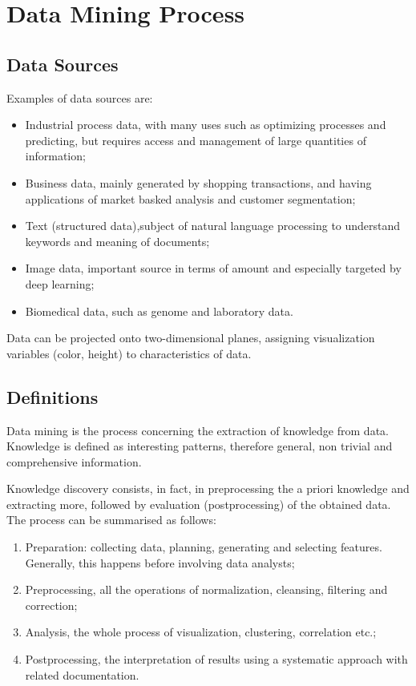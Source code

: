 \section{Data Mining Process}

\subsection{Data Sources}
Examples of data sources are: 
\begin{itemize}
	\item Industrial process data, with many uses such as optimizing processes and predicting, but requires access and management of large quantities of information;
	\item Business data, mainly generated by shopping transactions, and having applications of market basked analysis and customer segmentation;
	\item Text (structured data),subject of natural language processing to understand keywords and meaning of documents;
	\item Image data, important source in terms of amount and especially targeted by deep learning;
	\item Biomedical data, such as genome and laboratory data.
\end{itemize}

Data can be projected onto two-dimensional planes, assigning visualization variables (color, height) to characteristics of data.

\subsection{Definitions}
Data mining is the process concerning the extraction of knowledge from data. Knowledge is defined as interesting patterns, therefore general, non trivial and comprehensive information.

Knowledge discovery consists, in fact, in preprocessing the a priori knowledge and extracting more, followed by evaluation (postprocessing) of the obtained data. The process can be summarised as follows:
\begin{enumerate}
	\item Preparation: collecting data, planning, generating and selecting features. Generally, this happens before involving data analysts;
	\item Preprocessing, all the operations of normalization, cleansing, filtering and correction;
	\item Analysis, the whole process of visualization, clustering, correlation etc.;
	\item Postprocessing, the interpretation of results using a systematic approach with related documentation.
\end{enumerate}


